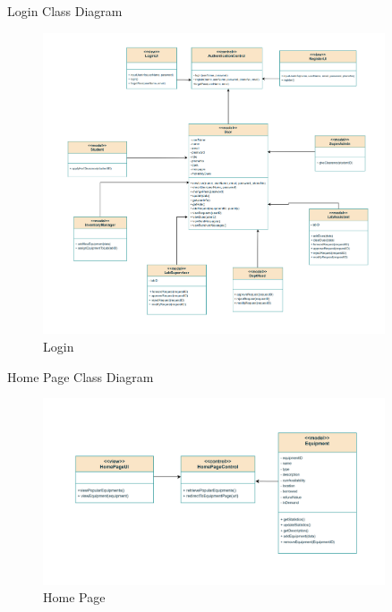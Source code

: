 \documentclass[20pt]{beamer}
\numberwithin{figure}{section}
\begin{document}
\begin{frame}{Login Class Diagram}

     \begin{figure}
        \centering
        \includegraphics[width= 0.9\textwidth , height= 0.8\paperheight]{LoginUML.png}
        \caption{{Login}}
        \label{fig:5}
    \end{figure}

\end{frame}

\begin{frame}{Home Page Class Diagram}

     \begin{figure}
        \centering
        \includegraphics[width= 0.9\textwidth , height= 0.8\paperheight]{HomePageUML.png}
        \caption{{Home Page}}
        \label{fig:6}
    \end{figure}

\end{frame}
\end{document}
